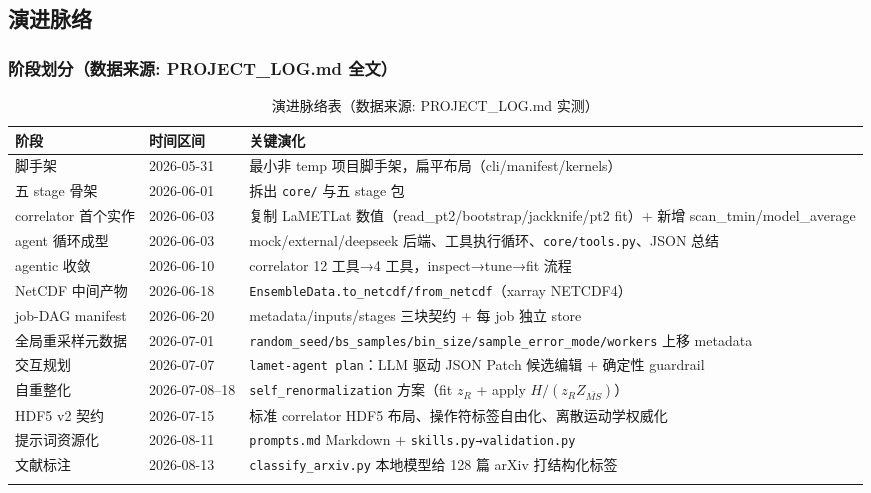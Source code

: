 \documentclass[UTF8]{ctexart}
\begin{document}
\subsection{演进脉络}

\subsubsection{阶段划分（数据来源: PROJECT\_LOG.md 全文）}

\begin{xltabular}{\textwidth}{llX}
\toprule
\textcolor{idea}{阶段} & 时间区间 & 关键演化 \\
\midrule
\endhead
脚手架 & 2026-05-31 & 最小非 temp 项目脚手架，扁平布局（cli/manifest/kernels）\\
五 stage 骨架 & 2026-06-01 & 拆出 \texttt{core/} 与五 stage 包 \\
correlator 首个实作 & 2026-06-03 & 复制 LaMETLat 数值（read\_pt2/bootstrap/jackknife/pt2 fit）+ 新增 scan\_tmin/model\_average \\
agent 循环成型 & 2026-06-03 & mock/external/deepseek 后端、工具执行循环、\texttt{core/tools.py}、JSON 总结 \\
agentic 收敛 & 2026-06-10 & correlator 12 工具→4 工具，inspect→tune→fit 流程 \\
NetCDF 中间产物 & 2026-06-18 & \texttt{EnsembleData.to\_netcdf/from\_netcdf}（xarray NETCDF4）\\
job-DAG manifest & 2026-06-20 & metadata/inputs/stages 三块契约 + 每 job 独立 store \\
全局重采样元数据 & 2026-07-01 & \texttt{\nolinkurl{random_seed/bs_samples/bin_size/sample_error_mode/workers}} 上移 metadata \\
交互规划 & 2026-07-07 & \texttt{lamet-agent plan}：LLM 驱动 JSON Patch 候选编辑 + 确定性 guardrail \\
自重整化 & 2026-07-08--18 & \texttt{self\_renormalization} 方案（fit $z_R$ + apply $H/(z_R Z_{\overline{MS}})$）\\
HDF5 v2 契约 & 2026-07-15 & 标准 correlator HDF5 布局、操作符标签自由化、离散运动学权威化 \\
提示词资源化 & 2026-08-11 & \texttt{prompts.md} Markdown + \texttt{skills.py→validation.py} \\
文献标注 & 2026-08-13 & \texttt{classify\_arxiv.py} 本地模型给 128 篇 arXiv 打结构化标签 \\
\bottomrule
\caption{演进脉络表（数据来源: PROJECT\_LOG.md 实测）}
\end{xltabular}
\end{document}
